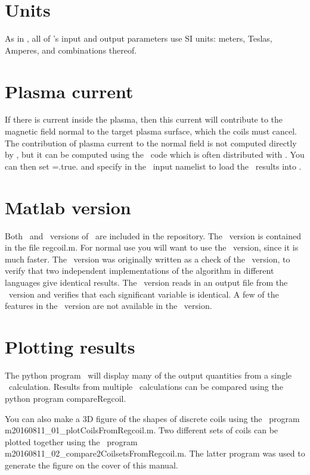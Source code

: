 \section{Units}

As in \vmec, all of \regcoil's input and output parameters use SI units: meters, Teslas, Amperes, and combinations thereof.

\section{Plasma current}

If there is current inside the plasma, then this current will contribute to the magnetic field normal
to the target plasma surface, which the coils must cancel. The contribution of plasma current to the normal field
is not computed directly by \regcoil, but it can be computed using the \bnorm~code which is 
often distributed with \vmec.  You can then set ={\ttfamily .true.} and specify 
in the \regcoil~input namelist to load the \bnorm~results into \regcoil.

\section{Matlab version}

Both \fortran~and \matlab~versions of \regcoil~are included in the repository.  The \matlab~version is
contained in the file {\ttfamily regcoil.m}. For normal
use you will want to use the \fortran~version, since it is much faster.  The \matlab~version was originally
written as a check of the \fortran~version, to verify that two independent implementations of the algorithm
in different languages give identical results.  The \matlab~version reads in an output file from the \fortran~version
and verifies that each significant variable is identical.  A few of the features in the \fortran~version
are not available in the \matlab~version.

\section{Plotting results}

The python program \regcoilPlot~will display many of the output quantities from a single \regcoil~calculation.
Results from multiple \regcoil~calculations can be compared using the python program {\ttfamily compareRegcoil}.

You can also make a 3D figure of the shapes of discrete coils using the \matlab~program {\ttfamily m20160811\_01\_plotCoilsFromRegcoil.m}.
Two different sets of coils can be plotted together using the \matlab~program {\ttfamily m20160811\_02\_compare2CoilsetsFromRegcoil.m}.
The latter program was used to generate the figure on the cover of this manual.

